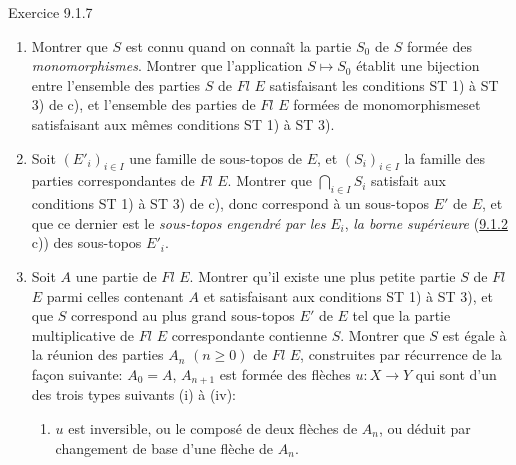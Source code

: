 \begin{enonce*}[remark]{Exercice 9.1.7}
\begin{enumerate}
\begin{itemize}
\item[ST 3)] Si $u:X\rightarrow Y$ est tel qu'il existe une famille
couvrante $Y_i\rightarrow Y$, $i\in I$, tel que
$u_i:X_i=\fprod{X}{Y_i}{Y}\to Y_{i}$ est dans $S$ pour tout $i\in
I$, alors $u\in S$.
\end{itemize}

Montrer qu'on obtient ainsi une correspondance biunivoque entre
l'ensemble des sous-topos $E'$ de $E$, et l'ensemble des parties $S$
de $Fl$ $E$ satisfaisant aux conditions ST 1), ST 2), ST 3). ($S$
étant donné, lui associer une $𝒰$-topologie $T'$, plus fine
que la topologie canonique $T$ de $E$, dont les familles couvrantes
$(X_i\rightarrow X)_{i\in I}$ sont celles pour lesquelles
l'inclusion $X'\hookrightarrow X$ de l'image des $X_i$ est $\in S$.
Montrer que la catégorie des faisceaux pour $T'$ est équivalente à
un sous-topos $E'$ de $E$, et utiliser . pour
prouver que celui-ci redonne $S$.

\item Montrer que $S$ est connu quand on connaît la partie $S_0$ de
$S$ formée des \emph{monomorphismes}. Montrer que l'application
$S\mapsto S_0$ établit une bijection entre l'ensemble des parties
$S$ de $Fl$ $E$ satisfaisant les conditions ST 1) à ST 3) de c), et
l'ensemble des parties de $Fl$ $E$ formées de
monomorphismes\pageoriginale et satisfaisant aux mêmes conditions ST
1) à ST 3).

\item Soit $(E'_i)_{i\in I}$ une famille de sous-topos de $E$, et
$(S_i)_{i\in I}$ la famille des parties correspondantes de $Fl$ $E$.
Montrer que $\bigcap_{i\in I} S_i$ satisfait aux conditions ST 1) à
ST 3) de c), donc correspond à un sous-topos $E'$ de $E$, et que ce
dernier est le \emph{sous-topos engendré par les} $E_i$, \ie
\emph{la borne supérieure} (\cf \hyperref[IV.rem9.1.2]{9.1.2} c)) des sous-topos
$E'_i$.

\item Soit $A$ une partie de $Fl$ $E$. Montrer qu'il existe une plus
petite partie $S$ de $Fl$ $E$ parmi celles contenant $A$ et
satisfaisant aux conditions ST 1) à ST 3), et que $S$ correspond au
plus grand sous-topos $E'$ de $E$ tel que la partie multiplicative
de $Fl$ $E$ correspondante contienne $S$. Montrer que $S$ est égale
à la réunion des parties $A_n$ $(n\geq 0)$ de $Fl$ $E$, construites
par récurrence de la façon suivante: $A_0=A$, $A_{n+1}$ est
formée des flèches $u:X\rightarrow Y$ qui sont d'un des trois types
suivants (i) à (iv):
\begin{enumerate}
\renewcommand{\theenumii}{\roman{enumii}}
\renewcommand{\labelenumii}{(\theenumii)}
\item $u$ est inversible, ou le composé de deux flèches de $A_n$,
ou déduit par changement de base d'une flèche de $A_n$.


\end{enumerate}
\end{enumerate}
\end{enonce*}
